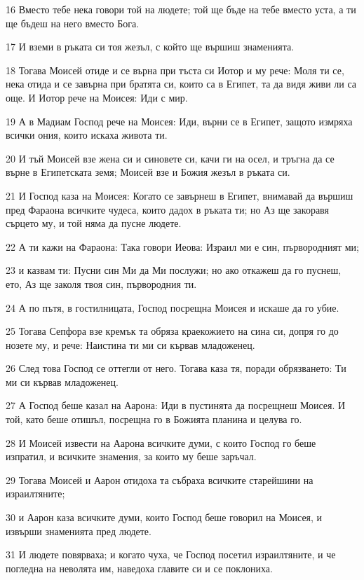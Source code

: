 \par 16 Вместо тебе нека говори той на людете; той ще бъде на тебе вместо уста, а ти ще бъдеш на него вместо Бога.
\par 17 И вземи в ръката си тоя жезъл, с който ще вършиш знаменията.
\par 18 Тогава Моисей отиде и се върна при тъста си Иотор и му рече: Моля ти се, нека отида и се завърна при братята си, които са в Египет, та да видя живи ли са още. И Иотор рече на Моисея: Иди с мир.
\par 19 А в Мадиам Господ рече на Моисея: Иди, върни се в Египет, защото измряха всички ония, които искаха живота ти.
\par 20 И тъй Моисей взе жена си и синовете си, качи ги на осел, и тръгна да се върне в Египетската земя; Моисей взе и Божия жезъл в ръката си.
\par 21 И Господ каза на Моисея: Когато се завърнеш в Египет, внимавай да вършиш пред Фараона всичките чудеса, които дадох в ръката ти; но Аз ще закоравя сърцето му, и той няма да пусне людете.
\par 22 А ти кажи на Фараона: Така говори Иеова: Израил ми е син, първородният ми;
\par 23 и казвам ти: Пусни син Ми да Ми послужи; но ако откажеш да го пуснеш, ето, Аз ще заколя твоя син, първородния ти.
\par 24 А по пътя, в гостилницата, Господ посрещна Моисея и искаше да го убие.
\par 25 Тогава Сепфора взе кремък та обряза краекожието на сина си, допря го до нозете му, и рече: Наистина ти ми си кървав младоженец.
\par 26 След това Господ се оттегли от него. Тогава каза тя, поради обрязването: Ти ми си кървав младоженец.
\par 27 А Господ беше казал на Аарона: Иди в пустинята да посрещнеш Моисея. И той, като беше отишъл, посрещна го в Божията планина и целува го.
\par 28 И Моисей извести на Аарона всичките думи, с които Господ го беше изпратил, и всичките знамения, за които му беше заръчал.
\par 29 Тогава Моисей и Аарон отидоха та събраха всичките старейшини на израилтяните;
\par 30 и Аарон каза всичките думи, които Господ беше говорил на Моисея, и извърши знаменията пред людете.
\par 31 И людете повярваха; и когато чуха, че Господ посетил израилтяните, и че погледна на неволята им, наведоха главите си и се поклониха.

